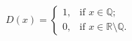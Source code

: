 \begin{equation}\label{eq:dirichlet}
D(x) = \begin{cases}
1, & \text{if } x \in \mathbb{Q}; \\
0, & \text{if } x \in
     \mathbb{R}\setminus\mathbb{Q}.
\end{cases}
\end{equation}
